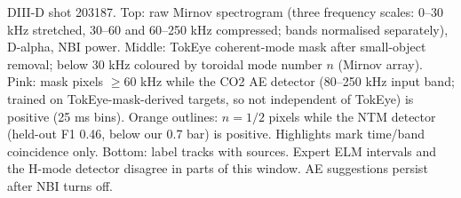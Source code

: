 \caption{DIII-D shot 203187. Top: raw Mirnov spectrogram (three frequency scales: 0--30 kHz stretched, 30--60 and 60--250 kHz compressed; bands normalised separately), D-alpha, NBI power. Middle: TokEye coherent-mode mask after small-object removal; below 30 kHz coloured by toroidal mode number $n$ (Mirnov array). Pink: mask pixels $\geq$60 kHz while the CO2 AE detector (80--250 kHz input band; trained on TokEye-mask-derived targets, so not independent of TokEye) is positive (25 ms bins). Orange outlines: $n=1/2$ pixels while the NTM detector (held-out F1 0.46, below our 0.7 bar) is positive. Highlights mark time/band coincidence only. Bottom: label tracks with sources. Expert ELM intervals and the H-mode detector disagree in parts of this window. AE suggestions persist after NBI turns off.}
\label{fig:interpreter-203187}
